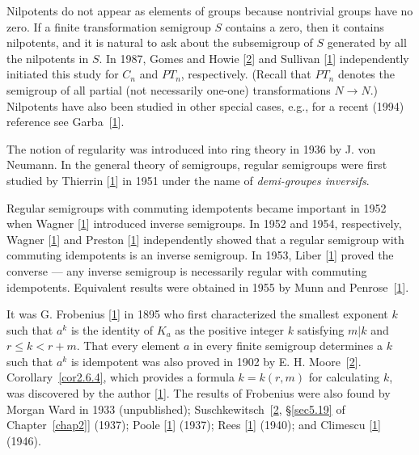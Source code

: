 \documentclass{surv-l}
\numberwithin{equation}{section}
\numberwithin{table}{section}
\numberwithin{figure}{section}
\theoremstyle{definition}
\begin{document}
Nilpotents do not appear as elements of groups because nontrivial
groups have no zero. If a finite transformation semigroup $S$
contains a zero, then it contains nilpotents, and it is natural to
ask about the subsemigroup of $S$ generated by all the nilpotents
in $S$. In 1987, Gomes and Howie [\hyperlink{bib22a}{2}] and
Sullivan [\hyperlink{bib72}{1}]
independently initiated this study for $C_{n}$ and $PT_{n}$,
respectively. (Recall that $PT_{n}$ denotes the semigroup of all
partial (not necessarily one-one) transformations $N\rightarrow
N$.) Nilpotents have also been studied in other special cases,
e.g., for a recent (1994) reference see Garba~[\hyperlink{bib18}{1}].

The notion of regularity was introduced into ring theory in 1936
by J. von Neumann. In the general theory of
semigroups, regular semigroups were first studied by
Thierrin [\hyperlink{bib76}{1}] in
1951 under the name of \emph{demi-groupes inversifs}.

Regular semigroups with commuting idempotents became important in
1952 when Wagner [\hyperlink{bib78}{1}] introduced
inverse semigroups. In 1952 and 1954, respectively, Wagner
[\hyperlink{bib78}{1}] and Preston
[\hyperlink{bib63}{1}] independently showed that a
regular semigroup with commuting idempotents is an inverse
semigroup. In 1953, Liber
[\hyperlink{bib42}{1}] proved the converse
--- any inverse semigroup is necessarily regular with commuting
idempotents. Equivalent results were obtained in 1955 by Munn and
Penrose~[\hyperlink{bib55}{1}].

It was G. Frobenius
[\hyperlink{bib17}{1}] in 1895 who first characterized
the smallest exponent $k$ such that $a^{k}$ is the identity of
$K_{a}$ as the positive integer $k$ satisfying $m|k$ and $r\leq
k<r+m$. That every element $a$ in every finite semigroup determines
a $k$ such that $a^{k}$ is idempotent was also proved in 1902 by
E. H. Moore~[\hyperlink{bib53a}{2}].
Corollary~\ref{cor2.6.4}, which provides a formula $k=k(r,m)$ for
calculating $k$, was discovered by the author
[\hyperlink{bib43}{1}]. The results of Frobenius were
also found by Morgan Ward in 1933 (unpublished);
Suschkewitsch~[\hyperlink{bib73a}{2}, \S\ref{sec5.19} of
Chapter~\ref{chap2}] (1937); Poole
[\hyperlink{bib61}{1}] (1937); Rees
[\hyperlink{bib23}{1}] (1940); and
Climescu [\hyperlink{bib9}{1}]
(1946).
\end{document}
